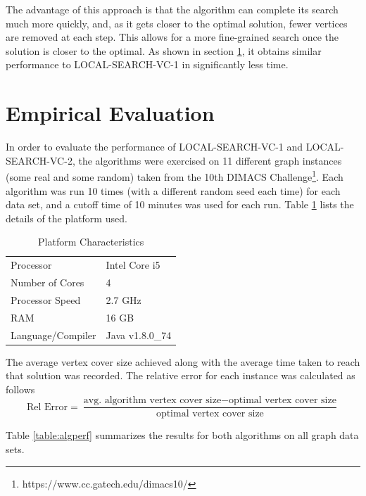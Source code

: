 \documentclass[sigconf]{acmart}
\begin{document}
The advantage of this approach is that the algorithm can complete its search much more quickly, and, as it gets closer to the optimal solution, fewer vertices are removed at each step. This allows for a more fine-grained search once the solution is closer to the optimal. As shown in section \ref{sec:eval}, it obtains similar performance to LOCAL-SEARCH-VC-1 in significantly less time.

\section{Empirical Evaluation} \label{sec:eval}
In order to evaluate the performance of LOCAL-SEARCH-VC-1 and LOCAL-SEARCH-VC-2, the algorithms were exercised on 11 different graph instances (some real and some random) taken from the 10th DIMACS Challenge\footnote{https://www.cc.gatech.edu/dimacs10/}. 
Each algorithm was run 10 times (with a different random seed each time) for each data set, and a cutoff time of 10 minutes was used for each run. Table \ref{table:platfm} lists the details of the platform used.
\begin{table}[h]
	\caption{Platform Characteristics}
	\label{table:platfm}
	\begin{tabular}{ll}
		\toprule
		Processor    		&	Intel Core i5 	\\
		Number of Cores		&	4				\\
		Processor Speed 	&	2.7 GHz			\\
		RAM					&	16 GB			\\
		Language/Compiler	&	Java v1.8.0\_74	\\
		\bottomrule
	\end{tabular}
\end{table}

The average vertex cover size achieved along with the average time taken to reach that solution was recorded. The relative error for each instance was calculated as follows
\begin{equation*}
	\textrm{Rel Error} = \frac{\textrm{avg. algorithm vertex cover size} - \textrm{optimal vertex cover size}}{\textrm{optimal vertex cover size}}
\end{equation*} 

Table \ref{table:algperf} summarizes the results for both algorithms on all graph data sets.
\end{document}
